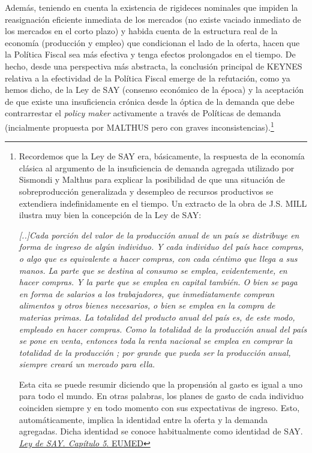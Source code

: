\documentclass[10pt,a4paper]{article}
\begin{document}
Además, teniendo en cuenta la existencia de rigideces nominales que impiden la reasignación eficiente inmediata de los mercados (no existe vaciado inmediato de los mercados en el corto plazo) y habida cuenta de la estructura real de la economía (producción y empleo) que condicionan el lado de la oferta, hacen que la Política Fiscal sea más efectiva y tenga efectos prolongados en el tiempo. De hecho, desde una perspectiva más abstracta, la conclusión principal de KEYNES relativa a la efectividad de la Política Fiscal emerge de la refutación, como ya hemos dicho, de la Ley de SAY (consenso económico de la época) y la aceptación de que existe una insuficiencia crónica desde la óptica de la demanda que debe contrarrestar el \textit{policy maker} activamente a través de Políticas de demanda (incialmente propuesta por MALTHUS pero con graves inconsistencias).\footnote{
Recordemos que la Ley de SAY era, básicamente, la respuesta de la economía clásica al argumento de la insuficiencia de demanda agregada utilizado por Sismondi y Malthus para explicar la posibilidad de que una situación de sobreproducción generalizada y desempleo de recursos productivos se extendiera indefinidamente en el tiempo. Un extracto de la obra de J.S. MILL ilustra muy bien la concepción de la Ley de SAY:

\textit{[..]Cada porción del valor de la producción anual de un país se distribuye en forma de ingreso de algún individuo. Y cada individuo del país hace compras, o algo que es equivalente a hacer compras, con cada céntimo que llega a sus manos. La parte que se destina al consumo se emplea, evidentemente, en hacer compras. Y la parte que se emplea en capital también. O bien se paga en forma de salarios a los trabajadores, que inmediatamente compran alimentos y otros bienes necesarios, o bien se emplea en la compra de materias primas. La totalidad del producto anual del país es, de este modo, empleado en hacer compras. Como la totalidad de la producción anual del país se pone en venta, entonces toda la renta nacional se emplea en comprar la totalidad de la producción ; por grande que pueda ser la producción anual, siempre creará un mercado para ella.}

Esta cita se puede resumir diciendo que la propensión al gasto es igual a uno para todo el mundo. En otras palabras, los planes de gasto de cada individuo coinciden siempre y en todo momento con sus expectativas de ingreso. Esto, automáticamente, implica la identidad entre la oferta y la demanda agregadas. Dicha identidad se conoce habitualmente como identidad de SAY.
\href{https://www.eumed.net/tesis-doctorales/jcrc/C-05.pdf}{\textit{Ley de SAY. Capítulo 5}. EUMED}
}
\end{document}
